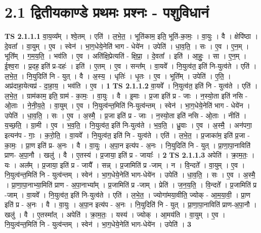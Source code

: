 \documentclass[17pt]{extarticle}
\begin{document}
\section*{ 2.1      द्वितीयकाण्डे  प्रथमः प्रश्नः - पशुविधानं }
                                \textbf{ TS 2.1.1.1} \newline
                  वा॒य॒व्य᳚म् । श्वे॒तम् । एति॑ । ल॒भे॒त॒ । भूति॑काम॒ इति॒ भूति॑-का॒मः॒ । वा॒युः । वै । क्षेपि॑ष्ठा । दे॒वता᳚ । वा॒युम् । ए॒व । स्वेन॑ । भा॒ग॒धेये॒नेति॑ भाग - धेये॑न । उपेति॑ । धा॒व॒ति॒ । सः । ए॒व । ए॒न॒म् । भूति᳚म् । ग॒म॒य॒ति॒ । भव॑ति । ए॒व । अति॑क्षि॒प्रेत्यति॑ - क्षि॒प्रा॒ । दे॒वता᳚ । इति॑ । आ॒हुः॒ । सा । ए॒न॒म् । ई॒श्व॒रा । प्र॒दह॒ इति॑ प्र-दहः॑ । इति॑ । ए॒तम् । ए॒व । सन्त᳚म् । वा॒यवे᳚ । नि॒युत्व॑त॒ इति॑ नि-युत्व॑ते । एति॑ । ल॒भे॒त॒ । नि॒युदिति॑ नि - युत् । वै । अ॒स्य॒ । धृतिः॑ । धृ॒तः । ए॒व । भूति᳚म् । उपेति॑ । ए॒ति॒ । अप्र॑दाहा॒येत्यप्र॑ - दा॒हा॒य॒ । भव॑ति । ए॒व । \textbf{  1} \newline
                  \newline
                                \textbf{ TS 2.1.1.2} \newline
                  वा॒यवे᳚ । नि॒युत्व॑त॒ इति॑ नि - युत्व॑ते । एति॑ । ल॒भे॒त॒ । ग्राम॑काम॒ इति॒ ग्राम॑ - का॒मः॒ । वा॒युः । वै । इ॒माः । प्र॒जा इति॑ प्र - जाः । न॒स्यो॒ता इति॑ नसि - ओ॒ताः । ने॒नी॒य॒ते॒ । वा॒युम् । ए॒व । नि॒युत्व॑न्त॒मिति॑ नि-युत्व॑न्तम् । स्वेन॑ । भा॒ग॒धेये॒नेति॑ भाग - धेये॑न । उपेति॑ । धा॒व॒ति॒ । सः । ए॒व । अ॒स्मै॒ । प्र॒जा इति॑ प्र - जाः । न॒स्यो॒ता इति॑ नसि - ओ॒ताः । नीति॑ । य॒च्छ॒ति॒ । ग्रा॒मी । ए॒व । भ॒व॒ति॒ । नि॒युत्व॑त॒ इति॑ नि-युत्व॑ते । भ॒व॒ति॒ । ध्रु॒वाः । ए॒व । अ॒स्मै॒ । अन॑पगा॒ इत्यन॑प - गाः॒ । क॒रो॒ति॒ । वा॒यवे᳚ । नि॒युत्व॑त॒ इति॑ नि - युत्व॑ते । एति॑ । ल॒भे॒त॒ । प्र॒जाका॑म॒ इति॑ प्र॒जा - का॒मः॒ । प्रा॒ण इति॑ प्र- अ॒नः । वै । वा॒युः । अ॒पा॒न इत्य॑प - अ॒नः । नि॒युदिति॑ नि - युत् । प्रा॒णा॒पा॒नाविति॑ प्राण- अ॒पा॒नौ । खलु॑ । वै । ए॒तस्य॑ । प्र॒जाया॒ इति॑ प्र - जायाः᳚ । \textbf{  2} \newline
                  \newline
                                \textbf{ TS 2.1.1.3} \newline
                  अपेति॑ । क्रा॒म॒तः॒ । यः । अल᳚म् । प्र॒जाया॒ इति॑ प्र - जायै᳚ । सन्न् । प्र॒जामिति॑ प्र -जाम् । न । वि॒न्दते᳚ । वा॒युम् । ए॒व । नि॒युत्व॑न्त॒मिति॑ नि - युत्व॑न्तम् । स्वेन॑ । भा॒ग॒धेये॒नेति॑ भाग-धेये॑न । उपेति॑ । धा॒व॒ति॒ । सः । ए॒व । अ॒स्मै॒ । प्रा॒णा॒पा॒नाभ्या॒मिति॑ प्राण - अ॒पा॒नाभ्या᳚म् । प्र॒जामिति॑ प्र -जाम् । प्रेति॑ । ज॒न॒य॒ति॒ । वि॒न्दते᳚ । प्र॒जामिति॑ प्र -जाम् । वा॒यवे᳚ । नि॒युत्व॑त॒ इति॑ नि-युत्व॑ते । एति॑ । ल॒भे॒त॒ । ज्योगा॑मया॒वीति॒ ज्योक् - आ॒म॒या॒वी॒ । प्रा॒ण इति॑ प्र - अ॒नः । वै । वा॒युः । अ॒पा॒न इत्य॑प - अ॒नः । नि॒युदिति॑ नि - युत् । प्रा॒णा॒पा॒नाविति॑ प्राण-अ॒पा॒नौ । खलु॑ । वै । ए॒तस्मा᳚त् । अपेति॑ । क्रा॒म॒तः॒ । यस्य॑ । ज्योक् । आ॒मय॑ति । वा॒युम् । ए॒व । नि॒युत्व॑न्त॒मिति॑ नि - युत्व॑न्तम् । स्वेन॑ । भा॒ग॒धेये॒नेति॑ भाग-धेये॑न । उपेति॑ । \textbf{  3} \newline
\end{document}
